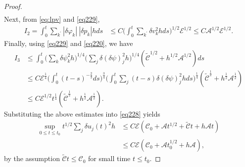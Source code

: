 \documentclass[10pt,a4paper]{amsart}
\begin{document}
\begin{proof}
\[\begin{aligned}
\end{aligned}\]
Next, from \eqref{eq:lpv} and \eqref{eq229},
\[\begin{aligned}
I_2=\int_{0}^{t}\sum_{k^{\prime}}|\delta\varphi_{k}|~|\delta p_{k}| hds &\leq C\Big(\int_{0}^{t}\sum\limits_{k^{\prime}}\delta v_{k}^{2}hds\Big)^{1/2}\mathscr{E}^{1/2} \leq C\mathscr{A}^{1/2}\mathscr{E}^{1/2}.
\end{aligned}\]
Finally, using \eqref{eq229} and \eqref{eq220}, we have
\[\begin{aligned}
I_3&\leq\int_{0}^{t}\Big(\sum_{k}\delta\psi_{k}^{2}h\Big)^{1/4}\Big(\sum_{j}\delta(\delta\psi)_{j}^{2}h\Big)^{1/4}(\tilde{\mathscr{C}}^{1/2}+h^{1/2}{\mathscr{A}}^{1/2})ds \\
&\leq C\mathscr{E}^{\frac14}\Big(\int_{0}^{t}(t-s)^{-\frac23}ds\Big)^{\frac34}\Big(\int_{0}^{t}\sum_{j}(t-s)\delta(\delta\psi)_{j}^{2}hds\Big)^{\frac14}(\tilde{\mathscr{C}}^{\frac12}+h^{\frac12}{\mathscr{A}}^{\frac12})\\
&\leq C\mathscr{E}^{1/2}t^{\frac14}(\tilde{\mathscr{C}}^{\frac12}+h^{\frac12}{\mathscr{A}}^{\frac12}).
\end{aligned}\]
Substituting the above estimates into \eqref{eq228} yields
\begin{equation}\label{eq230}
\begin{aligned}
  \sup\limits_{0\leq t\leq t_{0}}t^{1/2}\sum\limits_{j}\delta u_{j}(t)^{2}h&\leq C{\mathscr{E}}(\mathscr{C}_{0}+\mathscr{A}t^{1/2}+\tilde{\mathscr{C}}t+ h\mathscr{A}t)\\
  &\leq C{\mathscr{E}}(\mathscr{C}_{0}+\mathscr{A}t_0^{1/2}+ h\mathscr{A}),
\end{aligned}
\end{equation}
by the assumption $\tilde{\mathscr{C}}t\leq \mathscr{C}_{0}$ for small time $t\leq t_0$.


\end{proof}
\end{document}
